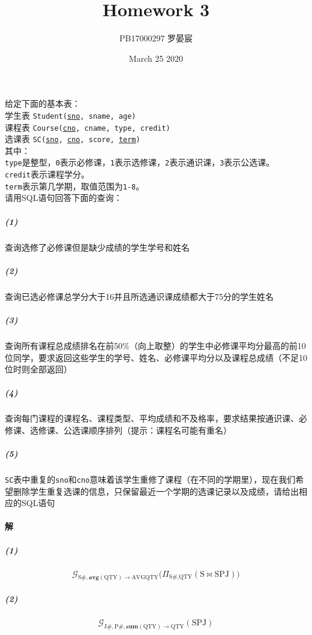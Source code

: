 \documentclass{article}
\title{Homework 3}
\author{PB17000297 罗晏宸}
\date{March 25 2020}
\makeatletter
\renewcommand{\section}{\@startsection{section}{1}{0mm}
                                {-5ex plus -.5ex minus -.2ex}
                                {3ex plus .2ex}
                                {\normalfont\large\bfseries}}
\makeatother
\begin{document}
\maketitle

\section{给定下面的基本表：
\protect\\ \indent 学生表 \texttt{Student(\uline{sno}, sname, age)}
\protect\\ \indent 课程表 \texttt{Course(\uline{cno}, cname, type, credit)}
\protect\\ \indent 选课表 \texttt{SC(\uline{sno}, \uline{cno}, score, \uline{term})}
\protect\\ 其中：
\protect\\ \indent \texttt{type}是整型，\texttt{0}表示必修课，\texttt{1}表示选修课，\texttt{2}表示通识课，\texttt{3}表示公选课。
\protect\\ \indent \texttt{credit}表示课程学分。
\protect\\ \indent \texttt{term}表示第几学期，取值范围为\texttt{1-8}。
\protect\\ 请用SQL语句回答下面的查询：}
\subparagraph{(1)} 查询选修了必修课但是缺少成绩的学生学号和姓名
\subparagraph{(2)} 查询已选必修课总学分大于16并且所选通识课成绩都大于75分的学生姓名
\subparagraph{(3)} 查询所有课程总成绩排名在前50\%（向上取整）的学生中必修课平均分最高的前10位同学，要求返回这些学生的学号、姓名、必修课平均分以及课程总成绩（不足10位时则全部返回）
\subparagraph{(4)} 查询每门课程的课程名、课程类型、平均成绩和不及格率，要求结果按通识课、必修课、选修课、公选课顺序排列（提示：课程名可能有重名）
\subparagraph{(5)} \texttt{SC}表中重复的\texttt{sno}和\texttt{cno}意味着该学生重修了课程（在不同的学期里），现在我们希望删除学生重复选课的信息，只保留最近一个学期的选课记录以及成绩，请给出相应的SQL语句

\paragraph{解}
\subparagraph{(1)}
\begin{Large}
\begin{equation*}
    \mathcal{G}_{\text{S\#}, \textbf{avg}(\text{QTY}) \rightarrow \text{AVGQTY}}\big(\Pi_{\text{S\#}, \text{QTY}}(\text{S} \Join \text{SPJ})\big)
\end{equation*}
\end{Large}

\subparagraph{(2)}
\begin{Large}
\begin{equation*}
    \mathcal{G}_{\text{J\#}, \text{P\#}, \textbf{sum}(\text{QTY}) \rightarrow \text{QTY}}(\text{SPJ})
\end{equation*}
\end{Large}
\end{document}
